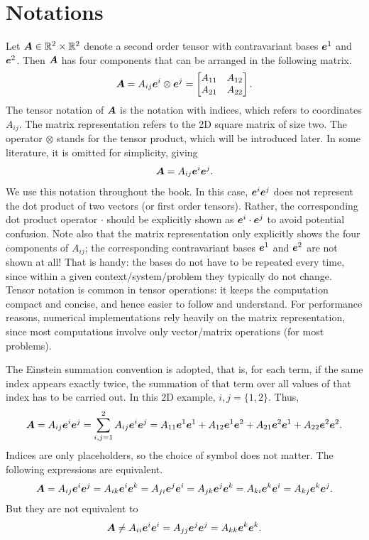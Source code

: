 \section{Notations}
Let $\bm{A}\in\mathbb{R}^2\times\mathbb{R}^2$ denote a second order tensor with contravariant bases $\bm{e}^1$ and $\bm{e}^2$.
Then $\bm{A}$ has four components that can be arranged in the following matrix.
\begin{gather}\label{eq:matrix_tensor}
\bm{A}=A_{ij}\bm{e}^i\otimes\bm{e}^j=\begin{bmatrix}
A_{11}&A_{12}\\
A_{21}&A_{22}
\end{bmatrix}.
\end{gather}
The tensor notation of $\bm{A}$ is the notation with indices, which refers to coordinates $A_{ij}$.
The matrix representation refers to the 2D square matrix of size two.
The operator $\otimes$ stands for the tensor product, which will be introduced later.
In some literature, it is omitted for simplicity, giving
\begin{gather}
\bm{A}=A_{ij}\bm{e}^i\bm{e}^j.
\end{gather}
We use this notation throughout the book.
In this case, $\bm{e}^i\bm{e}^j$ does not represent the dot product of two vectors (or first order tensors).
Rather, the corresponding dot product operator $\cdot$ should be explicitly shown as $\bm{e}^i\cdot\bm{e}^j$ to avoid potential confusion.
Note also that the matrix representation only explicitly shows the four components of $A_{ij}$; the corresponding contravariant bases $\bm{e}^1$ and $\bm{e}^2$ are not shown at all!
That is handy: the bases do not have to be repeated every time, since within a given context/system/problem they typically do not change.
Tensor notation is common in tensor operations: it keeps the computation compact and concise, and hence easier to follow and understand.
For performance reasons, numerical implementations rely heavily on the matrix representation, since most computations involve only vector/matrix operations (for most problems).

The Einstein summation convention is adopted, that is, for each term, if the same index appears exactly twice, the summation of that term over all values of that index has to be carried out.
In this 2D example, $i,j=\{1,2\}$.
Thus,
\begin{gather}
\bm{A}=A_{ij}\bm{e}^i\bm{e}^j=\sum_{i,j=1}^{2}A_{ij}\bm{e}^i\bm{e}^j=A_{11}\bm{e}^1\bm{e}^1+A_{12}\bm{e}^1\bm{e}^2+A_{21}\bm{e}^2\bm{e}^1+A_{22}\bm{e}^2\bm{e}^2.
\end{gather}
Indices are only placeholders, so the choice of symbol does not matter.
The following expressions are equivalent.
\begin{gather}
\bm{A}=A_{ij}\bm{e}^i\bm{e}^j=A_{ik}\bm{e}^i\bm{e}^k=A_{ji}\bm{e}^j\bm{e}^i=A_{jk}\bm{e}^j\bm{e}^k=A_{ki}\bm{e}^k\bm{e}^i=A_{kj}\bm{e}^k\bm{e}^j.
\end{gather}
But they are not equivalent to
\begin{gather}
\bm{A}\neq{}A_{ii}\bm{e}^i\bm{e}^i=A_{jj}\bm{e}^j\bm{e}^j=A_{kk}\bm{e}^k\bm{e}^k.
\end{gather}

